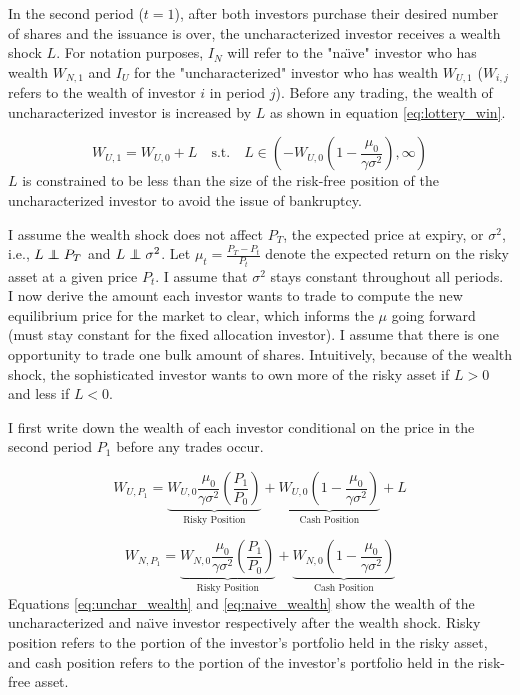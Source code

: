 \documentclass[12pt]{article}
\newcommand\independent{\protect\mathpalette{\protect\independenT}{\perp}}
\def\independenT#1#2{\mathrel{\rlap{$#1#2$}\mkern2mu{#1#2}}}
\begin{document}
In the second period ($t=1$), after both investors purchase their desired number of shares and the issuance is over, the uncharacterized investor receives a wealth shock $L$. For notation purposes, $I_N$ will refer to the "na\"{\i}ve" investor who has wealth $W_{N,1}$ and $I_U$ for the "uncharacterized" investor who has wealth $W_{U,1}$ ($W_{i,j}$ refers to the wealth of investor $i$ in period $j$). Before any trading, the wealth of uncharacterized investor is increased by $L$ as shown in equation \eqref{eq:lottery_win}.

\begin{equation}
    W_{U, 1} = W_{U, 0} + L \quad \text{s.t.} \quad L \in \left(-W_{U,0}\left(1-\frac{\mu_0}{\gamma\sigma^2}\right), \infty\right)
    \label{eq:lottery_win}
\end{equation}
$L$ is constrained to be less than the size of the risk-free position of the uncharacterized investor to avoid the issue of bankruptcy.

I assume the wealth shock does not affect $P_T$, the expected price at expiry, or $\sigma^2$, i.e., $L \independent P_T$ and $L \independent \sigma^2$. Let $\mu_t = \frac{P_T - P_t}{P_t}$ denote the expected return on the risky asset at a given price $P_t$. I assume that $\sigma^2$ stays constant throughout all periods. I now derive the amount each investor wants to trade to compute the new equilibrium price for the market to clear, which informs the $\mu$ going forward (must stay constant for the fixed allocation investor). I assume that there is one opportunity to trade one bulk amount of shares. Intuitively, because of the wealth shock, the sophisticated investor wants to own more of the risky asset if $L>0$ and less if $L<0$.

I first write down the wealth of each investor conditional on the price in the second period $P_1$ before any trades occur.

\begin{equation}
    W_{U, P_1} = \underbrace{W_{U,0}\frac{\mu_0}{\gamma\sigma^2} \left(\frac{P_1}{P_0}\right)}_\text{Risky Position} + \underbrace{W_{U,0}\left(1-\frac{\mu_0}{\gamma\sigma^2} \right)}_\text{Cash Position} + L
    \label{eq:unchar_wealth}
\end{equation}

\begin{equation}
    W_{N, P_1} = \underbrace{W_{N,0}\frac{\mu_0}{\gamma\sigma^2} \left(\frac{P_1}{P_0}\right)}_\text{Risky Position} + \underbrace{W_{N,0}\left(1-\frac{\mu_0}{\gamma\sigma^2} \right)}_\text{Cash Position}
    \label{eq:naive_wealth}
\end{equation}
Equations \eqref{eq:unchar_wealth} and \eqref{eq:naive_wealth} show the wealth of the uncharacterized and na\"{\i}ve investor respectively after the wealth shock. Risky position refers to the portion of the investor's portfolio held in the risky asset, and cash position refers to the portion of the investor's portfolio held in the risk-free asset.
\end{document}
